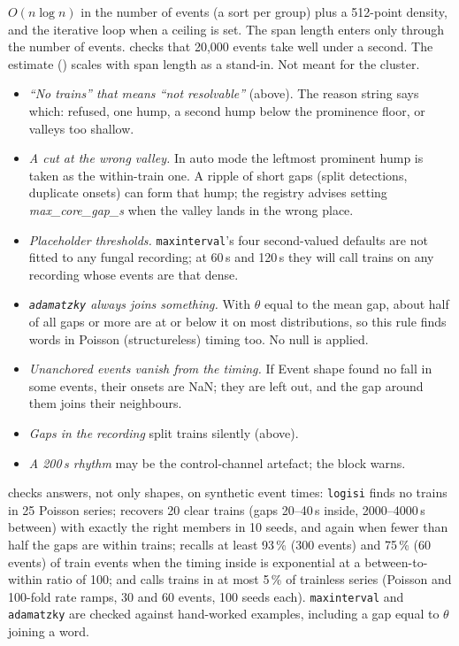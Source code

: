 $O(n \log n)$ in the number of events (a sort per group) plus a 512-point density, and the
iterative  loop when a ceiling is set. The span length enters only
through the number of events.  checks that 20{,}000 events take
well under a second. The estimate () scales with span length as a stand-in.
Not meant for the cluster.

\begin{itemize}
\item \emph{``No trains'' that means ``not resolvable''} (above). The reason string says
  which: refused, one hump, a second hump below the prominence floor, or valleys too shallow.
\item \emph{A cut at the wrong valley.} In auto mode the leftmost prominent hump is taken as
  the within-train one. A ripple of short gaps (split detections, duplicate onsets) can form
  that hump; the registry advises setting \emph{max\_core\_gap\_s} when the valley lands in
  the wrong place.
\item \emph{Placeholder thresholds.} \texttt{maxinterval}'s four second-valued defaults are
  not fitted to any fungal recording; at 60\,s and 120\,s they will call trains on any
  recording whose events are that dense.
\item \emph{\texttt{adamatzky} always joins something.} With $\theta$ equal to the mean gap,
  about half of all gaps or more are at or below it on most distributions, so this rule
  finds words in Poisson (structureless) timing too. No null is applied.
\item \emph{Unanchored events vanish from the timing.} If Event shape found no fall in some
  events, their onsets are NaN; they are left out, and the gap around them joins their
  neighbours.
\item \emph{Gaps in the recording} split trains silently (above).
\item \emph{A 200\,s rhythm} may be the control-channel artefact; the block warns.
\end{itemize}

 checks answers, not only shapes, on synthetic event times:
\texttt{logisi} finds no trains in 25 Poisson series; recovers 20 clear trains (gaps
20--40\,s inside, 2000--4000\,s between) with exactly the right members in 10 seeds, and
again when fewer than half the gaps are within trains; recalls at least 93\,\% (300 events)
and 75\,\% (60 events) of train events when the timing inside is exponential at a
between-to-within ratio of 100; and calls trains in at most 5\,\% of trainless series
(Poisson and 100-fold rate ramps, 30 and 60 events, 100 seeds each). \texttt{maxinterval}
and \texttt{adamatzky} are checked against hand-worked examples, including a gap equal to
$\theta$ joining a word.

